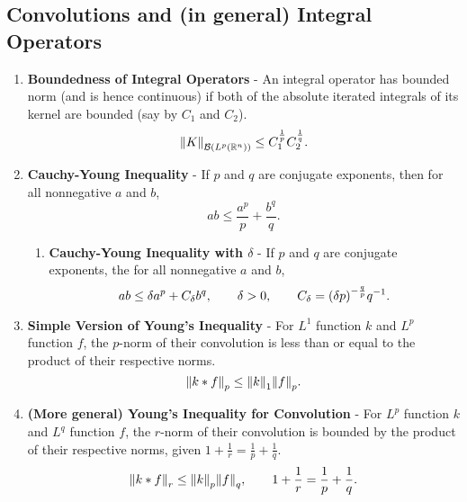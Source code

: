 \documentclass{article}
\newcommand{\Rl}{\mathbb{R}}
\begin{document}
    \subsection{Convolutions and (in general) Integral Operators}
    \begin{enumerate}
        \item
            \textbf{Boundedness of Integral Operators} - An integral operator has bounded norm (and is hence continuous) if both of the absolute iterated integrals of its kernel are bounded (say by $C_1$ and $C_2$). $$\norm{K}_{\mathcal{B}(L^p(\Rl^n))} \leq C_1^\frac{1}{p}C_2^\frac{1}{q}.$$
        \item
            \textbf{Cauchy-Young Inequality} - If $p$ and $q$ are conjugate exponents, then for all nonnegative $a$ and $b$, $$ab \leq \frac{a^p}{p} + \frac{b^q}{q}.$$
            \begin{enumerate}
                \item
                    \textbf{Cauchy-Young Inequality with $\delta$} - If $p$ and $q$ are conjugate exponents, the for all nonnegative $a$ and $b$, $$ab \leq \delta a^p + C_\delta b^q, \qquad \delta > 0, \qquad C_\delta = \qty(\delta p)^{-\frac{q}{p}}q^{-1}.$$
            \end{enumerate}
        \item
            \textbf{Simple Version of Young's Inequality} - For $L^1$ function $k$ and $L^p$ function $f$, the $p$-norm of their convolution is less than or equal to the product of their respective norms.  $$\norm{k * f}_p \leq \norm{k}_1 \norm{f}_p.$$
        \item
            \textbf{(More general) Young's Inequality for Convolution} - For $L^p$ function $k$ and $L^q$ function $f$, the $r$-norm of their convolution is bounded by the product of their respective norms, given $1 + \frac{1}{r} = \frac{1}{p} + \frac{1}{q}$.  $$\norm{k * f}_r \leq \norm{k}_p\norm{f}_q, \qquad 1 + \frac{1}{r} = \frac{1}{p} + \frac{1}{q}.$$
    \end{enumerate}
\end{document}
